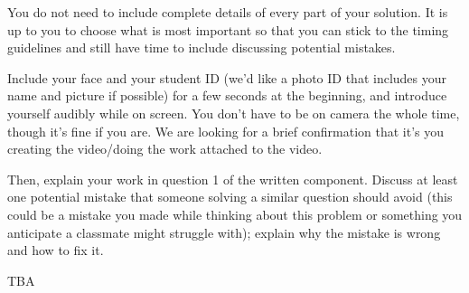 You do not need to include complete details of every part of your solution. 
It is up to you to choose what is most important so that you can stick to the 
timing guidelines and still have time to include discussing potential mistakes.

Include your face and your student ID (we'd like a photo ID that includes your name 
and picture if possible) for a few seconds at the beginning, and introduce yourself 
audibly while on screen. You don't have to be on camera the whole time, though it's fine 
if you are. We are looking for a brief confirmation that it's you creating the 
video/doing the work attached to the video.


Then, explain your work in question 1 of the written component.
Discuss at least one potential mistake that someone solving 
a similar question should avoid (this could be a mistake you made while thinking about this 
problem or something you anticipate a classmate might struggle with); explain why the 
mistake is wrong and how to fix it.
 
TBA

